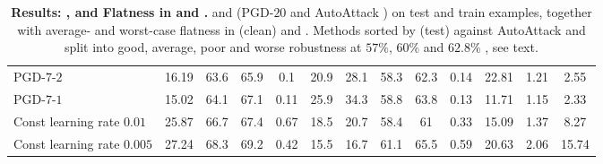 \begin{table}[t]
{\begin{tabularx}{\textwidth}{|X|c|c|c||c|c|c||c|c||c|c|c|c|}
		\rowcolor{colorbrewer0!15}\hspace*{2px} PGD-$7$-$2$ & 16.19 & 63.6 & 65.9 & 0.1 & 20.9 & 28.1 & 58.3 & 62.3 & 0.14 & 22.81 & 1.21 & 2.55\\
		\rowcolor{colorbrewer0!15}\hspace*{2px} PGD-$7$-$1$ & 15.02 & 64.1 & 67.1 & 0.11 & 25.9 & 34.3 & 58.8 & 63.8 & 0.13 & 11.71 & 1.15 & 2.33\\
		\rowcolor{colorbrewer0!15}\hspace*{2px} Const learning rate $0.01$ & 25.87 & 66.7 & 67.4 & 0.67 & 18.5 & 20.7 & 58.4 & 61 & 0.33 & 15.09 & 1.37 & 8.27\\
		\rowcolor{colorbrewer0!15}\hspace*{2px} Const learning rate $0.005$ & 27.24 & 68.3 & 69.2 & 0.42 & 15.5 & 16.7 & 61.1 & 65.5 & 0.59 & 20.63 & 2.06 & 15.74\\
		\hline
	\end{tabularx}
	}
	\vspace*{-8px}
	\caption{\textbf{Results: \TE, \RTE and Flatness in \CE and \RCE.} \TE and \RTE (PGD-$20$ and AutoAttack \cite{CroceICML2020}) on test and train examples, together with average- and worst-case flatness in (clean) \CE and \RCE. Methods sorted by (test) \RTE against AutoAttack and split into \colorbox{colorbrewer3!15}{good}, \colorbox{colorbrewer5!15}{average}, \colorbox{colorbrewer1!15}{poor} and \colorbox{colorbrewer0!15}{worse} robustness at $57\%$, $60\%$ and $62.8\%$ \RTE, see text.}
	\label{tab:supp-table-error}
	\vspace*{-6px}
\end{table}
